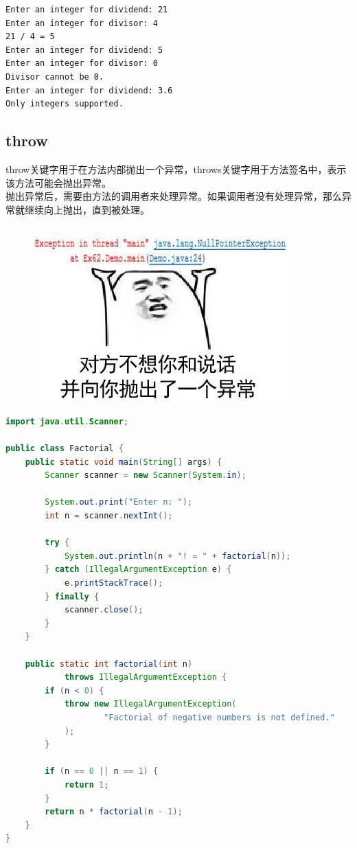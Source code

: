\begin{tcolorbox}
    \begin{verbatim}
Enter an integer for dividend: 21
Enter an integer for divisor: 4
21 / 4 = 5
Enter an integer for dividend: 5
Enter an integer for divisor: 0
Divisor cannot be 0.
Enter an integer for dividend: 3.6
Only integers supported.
	\end{verbatim}
\end{tcolorbox}

\vspace{0.5cm}

\subsection{throw}

throw关键字用于在方法内部抛出一个异常，throws关键字用于方法签名中，表示该方法可能会抛出异常。\\

抛出异常后，需要由方法的调用者来处理异常。如果调用者没有处理异常，那么异常就继续向上抛出，直到被处理。\\

\begin{figure}[H]
    \centering
    \includegraphics{img/Chapter9/9-1/2.png}
\end{figure}


\begin{lstlisting}[language=Java]
import java.util.Scanner;

public class Factorial {
    public static void main(String[] args) {
        Scanner scanner = new Scanner(System.in);

        System.out.print("Enter n: ");
        int n = scanner.nextInt();

        try {
            System.out.println(n + "! = " + factorial(n));
        } catch (IllegalArgumentException e) {
            e.printStackTrace();
        } finally {
            scanner.close();
        }
    }

    public static int factorial(int n)
            throws IllegalArgumentException {
        if (n < 0) {
            throw new IllegalArgumentException(
                    "Factorial of negative numbers is not defined."
            );
        }

        if (n == 0 || n == 1) {
            return 1;
        }
        return n * factorial(n - 1);
    }
}
\end{lstlisting}

